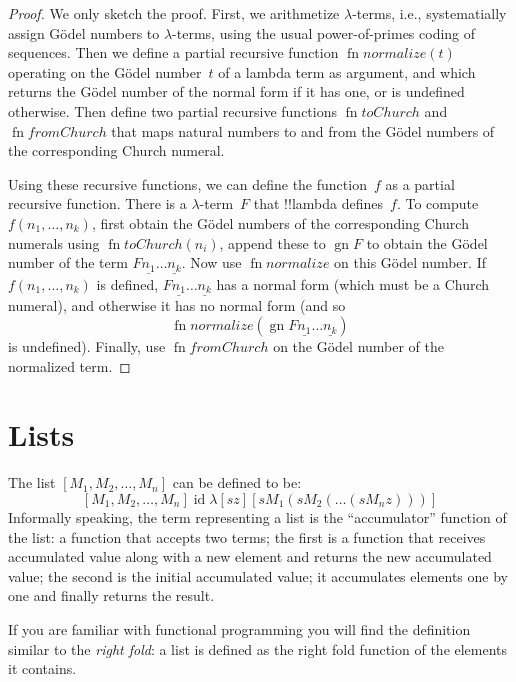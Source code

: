 \documentclass[10pt,a4paper]{article}
\theoremstyle{plain}
\theoremstyle{definition}
\theoremstyle{remark}
\newenvironment{digress}{}{}
\newcommand*{\olfileid}[3]{}
\newcommand*{\olsection}[1]{\section*{#1}}
\providecommand{\num}[1]{\underline{#1}}
\providecommand{\lambd}{\ensuremath{\lambda}}
\providecommand{\Gn}{\operatorname{gn}}
\providecommand{\ident}{\operatorname{id}}
\providecommand{\fn}{\operatorname{fn}}
\begin{document}
\begin{proof}
  We only sketch the proof. First, we arithmetize $\lambd$-terms,
  i.e., systematially assign G\"odel numbers to $\lambd$-terms, using
  the usual power-of-primes coding of sequences. Then we define a
  partial recursive function $\fn{normalize}(t)$ operating on the
  G\"odel number~$t$ of a lambda term as argument, and which returns
  the G\"odel number of the normal form if it has one, or is undefined
  otherwise.  Then define two partial recursive functions
  $\fn{toChurch}$ and $\fn{fromChurch}$ that maps natural numbers to
  and from the G\"odel numbers of the corresponding Church numeral.

  Using these recursive functions, we can define the function~$f$ as a
  partial recursive function. There is a $\lambd$-term~$F$ that
  !!{lambda define}s~$f$. To compute $f(n_1, \dots, n_k)$, first obtain
  the G\"odel numbers of the corresponding Church numerals using
  $\fn{toChurch}(n_i)$, append these to $\Gn{F}$ to obtain the G\"odel
  number of the term $F \num{n_1}\dots\num{n_k}$. Now use
  $\fn{normalize}$ on this G\"odel number. If $f(n_1, \dots, n_k)$ is
  defined, $F \num{n_1}\dots\num{n_k}$ has a normal form (which must
  be a Church numeral), and otherwise it has no normal form (and so
  \[\fn{normalize}(\Gn{F\num{n_1}\dots\num{n_k}})\] is undefined).
  Finally, use $\fn{fromChurch}$ on the G\"odel number of the
  normalized term.
\end{proof}





\olfileid{lam}{ldf}{lst}
\olsection{Lists}

The list $[M_1, M_2, \ldots, M_n]$ can be defined to be:
\[
  [M_1, M_2, \ldots, M_n] \ident \lambd[sz][s M_1 (s M_2 (\ldots (s M_n z)))]
\]
Informally speaking, the term representing a list is the
``accumulator'' function of the list: a function that accepts two
terms; the first is a function that receives accumulated value along
with a new element and returns the new accumulated value; the second
is the initial accumulated value; it accumulates elements one by one
and finally returns the result.

\begin{digress}
  If you are familiar with functional programming you will find the
  definition similar to the \emph{right fold}: a list is defined as
  the right fold function of the elements it contains.
\end{digress}
\end{document}
